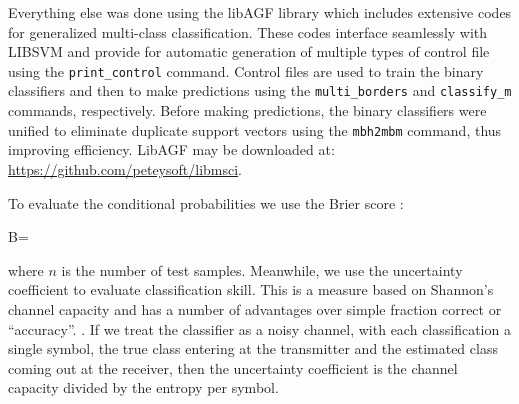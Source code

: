 Everything else was done using the libAGF library \citep{Mills2011,Mills2018}
which includes extensive codes for generalized multi-class classification.
These codes interface seamlessly with LIBSVM and provide for automatic
generation of multiple types of control file using the \verb/print_control/
command.
Control files are used to train the binary classifiers and then
to make predictions using the \verb/multi_borders/ and \verb/classify_m/
commands, respectively.
Before making predictions, the binary classifiers were unified to eliminate
duplicate support vectors using the \verb/mbh2mbm/ command, thus improving
efficiency.
LibAGF may be downloaded at: \url{https://github.com/peteysoft/libmsci}.

To evaluate the conditional probabilities we use the Brier score
\citep{Brier1950, Jolliffe_Stephenson2003}:
\begin{eqnnon}
B=
\end{eqnnon}
where $n$ is the number of test samples.
Meanwhile, we use the uncertainty coefficient to evaluate classification skill.
This is a measure based on Shannon's channel capacity \citep{Shannon} and
has a number of advantages over simple fraction correct or ``accuracy''. 
\citep{Press_etal1992,Mills2011}.
If we treat the classifier as a noisy channel, with each classification a
single symbol, the true class entering at the transmitter and the estimated
class coming out at the receiver,
then the uncertainty coefficient is the channel capacity divided by the
entropy per symbol.

